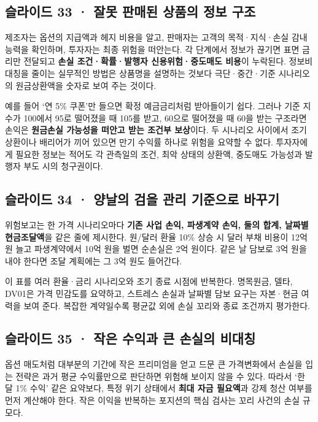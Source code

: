 \documentclass[11pt,a4paper]{article}
\begin{document}
\subsection{슬라이드 33 · 잘못 판매된 상품의 정보 구조}
제조자는 옵션의 지급액과 헤지 비용을 알고, 판매자는 고객의 목적·지식·손실 감내 능력을 확인하며, 투자자는 최종 위험을 떠안는다. 각 단계에서 정보가 끊기면 표면 금리만 전달되고 \textbf{손실 조건·확률·발행자 신용위험·중도매도 비용}이 누락된다. 정보비대칭을 줄이는 실무적인 방법은 상품명을 설명하는 것보다 극단·중간·기준 시나리오의 원금상환액을 숫자로 보여 주는 것이다.\par

예를 들어 ‘연 5\% 쿠폰’만 들으면 확정 예금금리처럼 받아들이기 쉽다. 그러나 기준 지수가 100에서 95로 떨어졌을 때 105를 받고, 60으로 떨어졌을 때 60을 받는 구조라면 손익은 \textbf{원금손실 가능성을 떠안고 받는 조건부 보상}이다. 두 시나리오 사이에서 조기상환이나 배리어가 끼어 있으면 만기 수익률 하나로 위험을 요약할 수 없다. 투자자에게 필요한 정보는 적어도 각 관측일의 조건, 최악 상태의 상환액, 중도매도 가능성과 발행자 부도 시의 청구권이다.\par

\subsection{슬라이드 34 · 양날의 검을 관리 기준으로 바꾸기}
위험보고는 한 가격 시나리오마다 \textbf{기존 사업 손익, 파생계약 손익, 둘의 합계, 날짜별 현금조달액}을 같은 줄에 제시한다. 원/달러 환율 10\% 상승 시 달러 부채 비용이 12억 원 늘고 파생계약에서 10억 원을 벌면 순손실은 2억 원이다. 같은 날 담보로 3억 원을 내야 한다면 조달 계획에는 그 3억 원도 들어간다.\par

이 표를 여러 환율·금리 시나리오와 조기 종료 시점에 반복한다. 명목원금, 델타, DV01은 가격 민감도를 요약하고, 스트레스 손실과 날짜별 담보 요구는 자본·현금 여력을 보여 준다. 복잡한 계약일수록 평균값 외에 손실 꼬리와 종료 조건까지 평가한다.\par

\subsection{슬라이드 35 · 작은 수익과 큰 손실의 비대칭}
옵션 매도처럼 대부분의 기간에 작은 프리미엄을 얻고 드문 큰 가격변화에서 손실을 입는 전략은 과거 평균 수익률만으로 판단하면 위험해 보이지 않을 수 있다. 따라서 ‘한 달 1\% 수익’ 같은 요약보다, 특정 위기 상태에서 \textbf{최대 자금 필요액}과 강제 청산 여부를 먼저 계산해야 한다. 작은 이익을 반복하는 포지션의 핵심 검사는 꼬리 사건의 손실 규모다.\par
\end{document}
